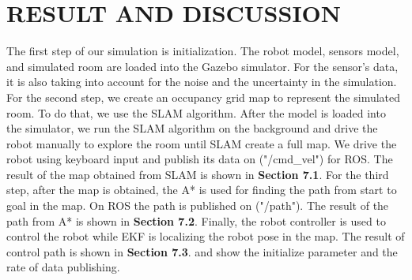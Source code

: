 \section{RESULT AND DISCUSSION}
\hspace{1.27cm}
The first step of our simulation is initialization. The robot model, sensors model, and simulated room are loaded into the Gazebo simulator. For the sensor's data, it is also taking into account for the noise and the uncertainty in the simulation. For the second step, we create an occupancy grid map to represent the simulated room. To do that, we use the SLAM algorithm. After the model is loaded into the simulator, we run the SLAM algorithm on the background and drive the robot manually to explore the room until SLAM create a full map. We drive the robot using keyboard input and publish its data on ("/cmd\_vel") for ROS. The result of the map obtained from SLAM is shown in \textbf{Section 7.1}. For the third step, after the map is obtained, the A* is used for finding the path from start to goal in the map. On ROS the path is published on ("/path"). The result of the path from A* is shown in \textbf{Section 7.2}. Finally, the robot controller is used to control the robot while EKF is localizing the robot pose in the map. The result of control path is shown in \textbf{Section 7.3}. \textbf{\tableautorefname{ \ref{Table: Simulation Parameters}}} and \textbf{\tableautorefname{ \ref{Table: Sensor and Algorithm Data Publication Rate for EKF}}} show the initialize parameter and the rate of data publishing.\par




